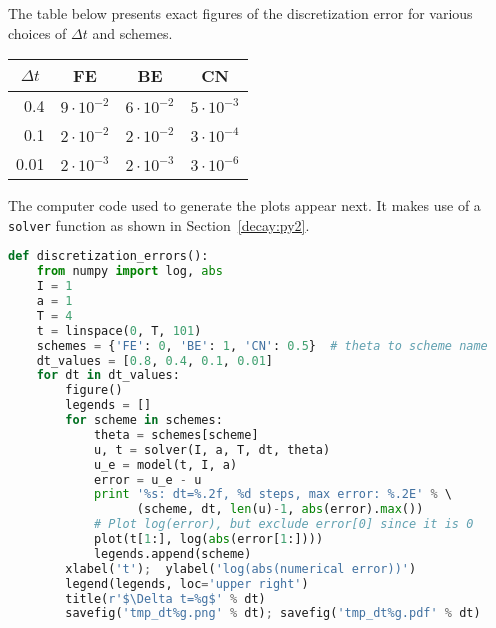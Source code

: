 \documentclass[graybox,sectrefs,envcountresetchap,open=right,final]{svmonodo}
\begin{document}
The table below presents exact figures of the discretization error
for various choices of $\Delta t$ and schemes.



{\small   %

\vspace{4mm}

\begin{tabular}{rrrr}
\hline
\multicolumn{1}{c}{ $\Delta t$ } & \multicolumn{1}{c}{ FE } & \multicolumn{1}{c}{ BE } & \multicolumn{1}{c}{ CN } \\
\hline
0.4        & $9\cdot 10^{-2}$ & $6\cdot 10^{-2}$ & $ 5\cdot 10^{-3}$ \\
0.1        & $2\cdot 10^{-2}$ & $2\cdot 10^{-2}$ & $ 3\cdot 10^{-4}$ \\
0.01       & $2\cdot 10^{-3}$ & $2\cdot 10^{-3}$ & $ 3\cdot 10^{-6}$ \\
\hline
\end{tabular}

\vspace{4mm}

}


\noindent
The computer code used to generate the plots appear next. It makes use
of a \texttt{solver} function
as shown in Section~\ref{decay:py2}.



























\begin{lstlisting}[language=python,style=blue1_bluegreen]
def discretization_errors():
    from numpy import log, abs
    I = 1
    a = 1
    T = 4
    t = linspace(0, T, 101)
    schemes = {'FE': 0, 'BE': 1, 'CN': 0.5}  # theta to scheme name
    dt_values = [0.8, 0.4, 0.1, 0.01]
    for dt in dt_values:
        figure()
        legends = []
        for scheme in schemes:
            theta = schemes[scheme]
            u, t = solver(I, a, T, dt, theta)
            u_e = model(t, I, a)
            error = u_e - u
            print '%s: dt=%.2f, %d steps, max error: %.2E' % \ 
                  (scheme, dt, len(u)-1, abs(error).max())
            # Plot log(error), but exclude error[0] since it is 0
            plot(t[1:], log(abs(error[1:])))
            legends.append(scheme)
        xlabel('t');  ylabel('log(abs(numerical error))')
        legend(legends, loc='upper right')
        title(r'$\Delta t=%g$' % dt)
        savefig('tmp_dt%g.png' % dt); savefig('tmp_dt%g.pdf' % dt)

\end{lstlisting}
\end{document}
